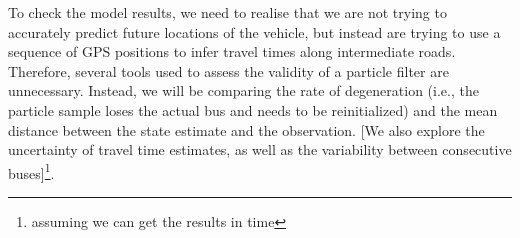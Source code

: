 To check the model results, 
we need to realise that we are not trying to accurately predict
future locations of the vehicle,
but instead are trying to use a sequence of GPS positions to infer travel
times along intermediate roads.
Therefore, several tools used to assess the validity of a particle filter
are unnecessary.
Instead, we will be comparing the rate of degeneration 
(i.e., the particle sample loses the actual bus and needs to be reinitialized)
and the mean distance between the state estimate and the observation.
[We also explore the uncertainty of travel time estimates,
as well as the variability between consecutive buses]\footnote{assuming we can get the results in time}.










